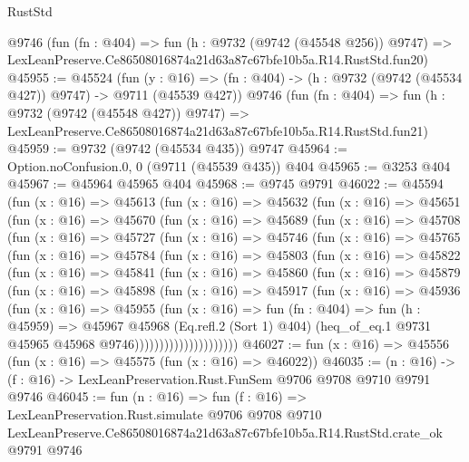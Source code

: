 \begin{lexlean}{RustStd}
\begin{coremodule}
    @9746
    (fun (fn : @404) =>
    fun (h : @9732 (@9742 (@45548 @256)) @9747) =>
    LexLeanPreserve.Ce86508016874a21d63a87c67bfe10b5a.R14.RustStd.fun20)
@45955 := @45524
    (fun (y : @16) => (fn : @404) -> (h : @9732 (@9742 (@45534 @427)) @9747) -> @9711 (@45539 @427))
    @9746
    (fun (fn : @404) =>
    fun (h : @9732 (@9742 (@45548 @427)) @9747) =>
    LexLeanPreserve.Ce86508016874a21d63a87c67bfe10b5a.R14.RustStd.fun21)
@45959 := @9732 (@9742 (@45534 @435)) @9747
@45964 := Option.noConfusion.{0, 0} (@9711 (@45539 @435)) @404
@45965 := @3253 @404
@45967 := @45964 @45965 @404
@45968 := @9745 @9791
@46022 := @45594
    (fun (x : @16) =>
    @45613
      (fun (x : @16) =>
      @45632
        (fun (x : @16) =>
        @45651
          (fun (x : @16) =>
          @45670
            (fun (x : @16) =>
            @45689
              (fun (x : @16) =>
              @45708
                (fun (x : @16) =>
                @45727
                  (fun (x : @16) =>
                  @45746
                    (fun (x : @16) =>
                    @45765
                      (fun (x : @16) =>
                      @45784
                        (fun (x : @16) =>
                        @45803
                          (fun (x : @16) =>
                          @45822
                            (fun (x : @16) =>
                            @45841
                              (fun (x : @16) =>
                              @45860
                                (fun (x : @16) =>
                                @45879
                                  (fun (x : @16) =>
                                  @45898
                                    (fun (x : @16) =>
                                    @45917
                                      (fun (x : @16) =>
                                      @45936
                                        (fun (x : @16) =>
                                        @45955
                                          (fun (x : @16) =>
                                          fun (fn : @404) =>
                                          fun (h : @45959) =>
                                          @45967
                                            @45968
                                            (Eq.refl.{2} (Sort 1) @404)
                                            (heq_of_eq.{1}
                                              @9731
                                              @45965
                                              @45968
                                              @9746)))))))))))))))))))))
@46027 := fun (x : @16) => @45556 (fun (x : @16) => @45575 (fun (x : @16) => @46022))
@46035 := (n : @16) -> (f : @16) -> LexLeanPreservation.Rust.FunSem @9706 @9708 @9710 @9791 @9746
@46045 := fun (n : @16) =>
  fun (f : @16) =>
  LexLeanPreservation.Rust.simulate
    @9706
    @9708
    @9710
    LexLeanPreserve.Ce86508016874a21d63a87c67bfe10b5a.R14.RustStd.crate_ok
    @9791
    @9746
\end{coremodule}
\end{lexlean}
